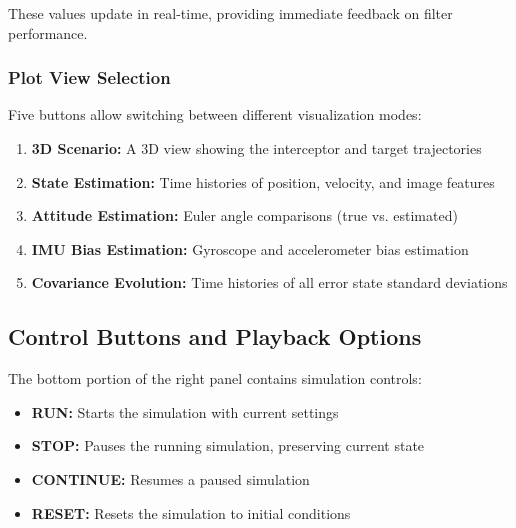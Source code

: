 \documentclass[11pt,a4paper]{article}
\begin{document}
These values update in real-time, providing immediate feedback on filter performance.

\subsubsection{Plot View Selection}
Five buttons allow switching between different visualization modes:

\begin{enumerate}
    \item \textbf{3D Scenario:} A 3D view showing the interceptor and target trajectories
    \item \textbf{State Estimation:} Time histories of position, velocity, and image features
    \item \textbf{Attitude Estimation:} Euler angle comparisons (true vs. estimated)
    \item \textbf{IMU Bias Estimation:} Gyroscope and accelerometer bias estimation
    \item \textbf{Covariance Evolution:} Time histories of all error state standard deviations
\end{enumerate}

\subsection{Control Buttons and Playback Options}

The bottom portion of the right panel contains simulation controls:

\begin{itemize}
    \item \textbf{RUN:} Starts the simulation with current settings
    \item \textbf{STOP:} Pauses the running simulation, preserving current state
    \item \textbf{CONTINUE:} Resumes a paused simulation
    \item \textbf{RESET:} Resets the simulation to initial conditions
\end{itemize}
\end{document}
